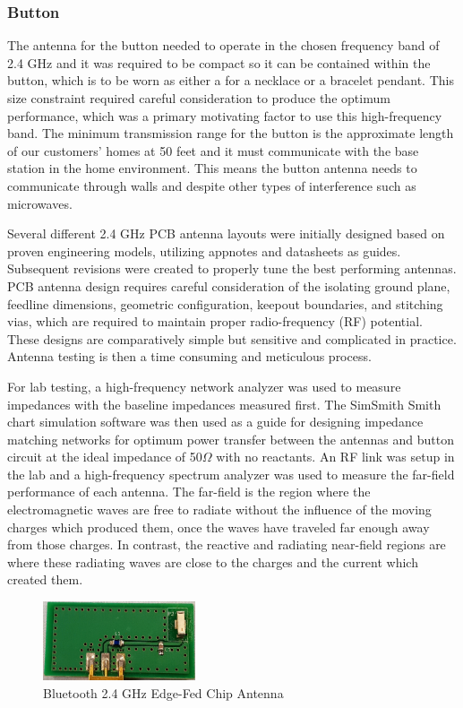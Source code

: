 \documentclass[journal,compsoc]{IEEEtran}
\begin{document}
\subsubsection{Button}

The antenna for the button needed to operate in the chosen frequency band of 2.4 GHz and it was required to be compact so it can be contained within the button, which is to be worn as either a for a necklace or a bracelet pendant.  This size constraint required careful consideration to produce the optimum performance, which was a primary motivating factor to use this high-frequency band.  The minimum transmission range for the button is the approximate length of our customers’ homes at 50 feet and it must communicate with the base station in the home environment.  This means the button antenna needs to communicate through walls and despite other types of interference such as microwaves.

Several different 2.4 GHz PCB antenna layouts were initially designed based on proven engineering models, utilizing appnotes and datasheets as guides.  Subsequent revisions were created to properly tune the best performing antennas.  PCB antenna design requires careful consideration of the isolating ground plane, feedline dimensions, geometric configuration, keepout boundaries, and stitching vias, which are required to maintain proper radio-frequency (RF) potential.  These designs are comparatively simple but sensitive and complicated in practice.  Antenna testing is then a time consuming and meticulous process.

For lab testing, a high-frequency network analyzer was used to measure impedances with the baseline impedances measured first.  The SimSmith Smith chart simulation software was then used as a guide for designing impedance matching networks for optimum power transfer between the antennas and button circuit at the ideal impedance of 50$\Omega$ with no reactants.  An RF link was setup in the lab and a high-frequency spectrum analyzer was used to measure the far-field performance of each antenna.  The far-field is the region where the electromagnetic waves are free to radiate without the influence of the moving charges which produced them, once the waves have traveled far enough away from those charges.  In contrast, the reactive and radiating near-field regions are where these radiating waves are close to the charges and the current which created them.

\begin{figure}[ht]	%
\centering
\includegraphics[width=0.4\textwidth]{2_4GHzChipAntenna.jpg}
\caption{Bluetooth 2.4 GHz Edge-Fed Chip Antenna}
\label{2.4 Chip}
\end{figure}
\end{document}
